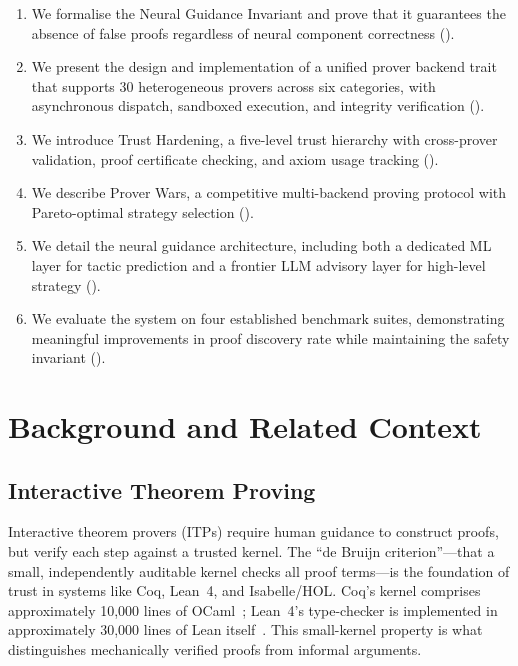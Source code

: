 \documentclass[11pt,a4paper]{article}
\begin{document}
\begin{enumerate}
  \item We formalise the Neural Guidance Invariant and prove that it guarantees
  the absence of false proofs regardless of neural component correctness
  ().

  \item We present the design and implementation of a unified prover backend
  trait that supports 30 heterogeneous provers across six categories, with
  asynchronous dispatch, sandboxed execution, and integrity verification
  ().

  \item We introduce Trust Hardening, a five-level trust hierarchy with
  cross-prover validation, proof certificate checking, and axiom usage
  tracking ().

  \item We describe Prover Wars, a competitive multi-backend proving protocol
  with Pareto-optimal strategy selection ().

  \item We detail the neural guidance architecture, including both a dedicated
  ML layer for tactic prediction and a frontier LLM advisory layer for
  high-level strategy ().

  \item We evaluate the system on four established benchmark suites,
  demonstrating meaningful improvements in proof discovery rate while
  maintaining the safety invariant ().
\end{enumerate}


\section{Background and Related Context}
\label{sec:background}

\subsection{Interactive Theorem Proving}

Interactive theorem provers (ITPs) require human guidance to construct
proofs, but verify each step against a trusted kernel. The ``de Bruijn
criterion''---that a small, independently auditable kernel checks all proof
terms---is the foundation of trust in systems like Coq, Lean~4, and
Isabelle/HOL. Coq's kernel comprises approximately 10,000 lines of
OCaml~\citep{coq}; Lean~4's type-checker is implemented in approximately
30,000 lines of Lean itself~\citep{lean4}. This small-kernel property is what
distinguishes mechanically verified proofs from informal arguments.
\end{document}
